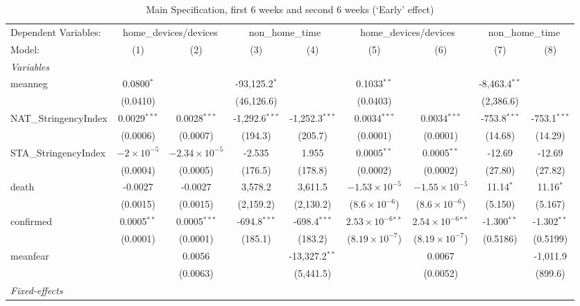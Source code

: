 \documentclass{article}
\begin{document}
\begin{landscape}
\begin{table}
  \caption{Main Specification, first 6 weeks and second 6 weeks (`Early' effect)}\label{tab:sixweeks}
  \begin{tabular}{lcccccccc}
    \tabularnewline\midrule\midrule
    Dependent Variables:&\multicolumn{2}{c}{home\_devices/devices}&\multicolumn{2}{c}{non\_home\_time}&\multicolumn{2}{c}{home\_devices/devices}&\multicolumn{2}{c}{non\_home\_time}\\
    Model:&(1) & (2) & (3) & (4) & (5) & (6) & (7) & (8)\\
    \midrule \emph{Variables}&   &   &   &   &   &   &   &  \\
    meanneg&0.0800$^{*}$ &    & -93,125.2$^{*}$ &    & 0.1033$^{**}$ &    & -8,463.4$^{**}$ &   \\
      &(0.0410) &    & (46,126.6) &    & (0.0403) &    & (2,386.6) &   \\
    NAT\_StringencyIndex&0.0029$^{***}$ & 0.0028$^{***}$ & -1,292.6$^{***}$ & -1,252.3$^{***}$ & 0.0034$^{***}$ & 0.0034$^{***}$ & -753.8$^{***}$ & -753.1$^{***}$\\
      &(0.0006) & (0.0007) & (194.3) & (205.7) & (0.0001) & (0.0001) & (14.68) & (14.29)\\
    STA\_StringencyIndex&$-2\times 10^{-5}$ & $-2.34\times 10^{-5}$ & -2.535 & 1.955 & 0.0005$^{**}$ & 0.0005$^{**}$ & -12.69 & -12.69\\
      &(0.0004) & (0.0005) & (176.5) & (178.8) & (0.0002) & (0.0002) & (27.80) & (27.82)\\
    death&-0.0027 & -0.0027 & 3,578.2 & 3,611.5 & $-1.53\times 10^{-5}$ & $-1.55\times 10^{-5}$ & 11.14$^{*}$ & 11.16$^{*}$\\
      &(0.0015) & (0.0015) & (2,159.2) & (2,130.2) & ($8.6\times 10^{-6}$) & ($8.6\times 10^{-6}$) & (5.150) & (5.167)\\
    confirmed&0.0005$^{**}$ & 0.0005$^{***}$ & -694.8$^{***}$ & -698.4$^{***}$ & $2.53\times 10^{-6}$$^{**}$ & $2.54\times 10^{-6}$$^{**}$ & -1.300$^{**}$ & -1.302$^{**}$\\
      &(0.0001) & (0.0001) & (185.1) & (183.2) & ($8.19\times 10^{-7}$) & ($8.19\times 10^{-7}$) & (0.5186) & (0.5199)\\
    meanfear&   & 0.0056 &    & -13,327.2$^{**}$ &    & 0.0067 &    & -1,011.9\\
      &   & (0.0063) &    & (5,441.5) &    & (0.0052) &    & (899.6)\\
    \midrule \emph{Fixed-effects}&   &   &   &   &   &   &   &  \\

\end{tabular}
\end{table}
\end{landscape}
\end{document}
